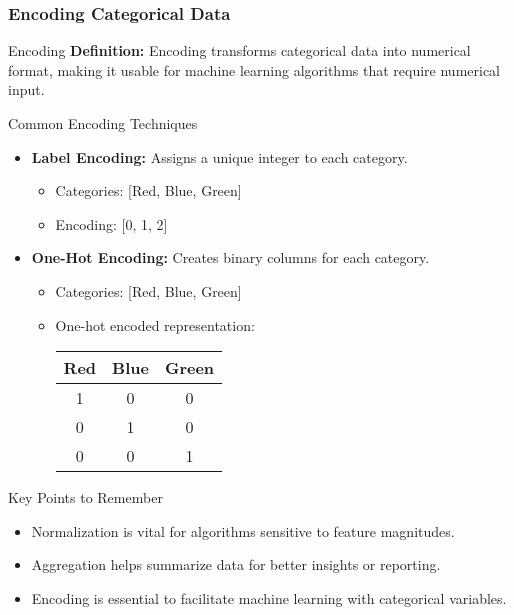\documentclass{beamer}
\begin{document}
\begin{frame}[fragile]
    \frametitle{Encoding Categorical Data}
    \begin{block}{Encoding}
        \textbf{Definition:} Encoding transforms categorical data into numerical format, making it usable for machine learning algorithms that require numerical input.
    \end{block}

    \begin{block}{Common Encoding Techniques}
        \begin{itemize}
            \item \textbf{Label Encoding:} Assigns a unique integer to each category.
            \begin{itemize}
                \item Categories: [Red, Blue, Green]
                \item Encoding: [0, 1, 2]
            \end{itemize}

            \item \textbf{One-Hot Encoding:} Creates binary columns for each category.
            \begin{itemize}
                \item Categories: [Red, Blue, Green]
                \item One-hot encoded representation:
                \begin{tabular}{|c|c|c|}
                    \hline
                    Red & Blue & Green \\
                    \hline
                    1   & 0    & 0     \\
                    0   & 1    & 0     \\
                    0   & 0    & 1     \\
                    \hline
                \end{tabular}
            \end{itemize}
        \end{itemize}
    \end{block}

    \begin{block}{Key Points to Remember}
        \begin{itemize}
            \item Normalization is vital for algorithms sensitive to feature magnitudes.
            \item Aggregation helps summarize data for better insights or reporting.
            \item Encoding is essential to facilitate machine learning with categorical variables.
        \end{itemize}
    \end{block}
\end{frame}
\end{document}
